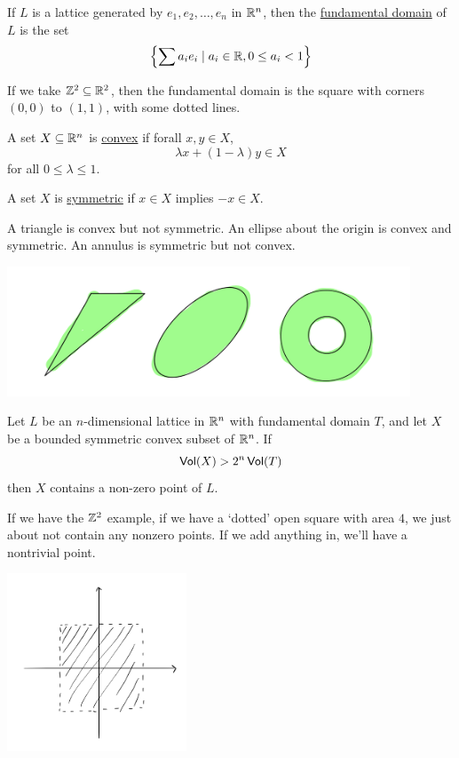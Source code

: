 \begin{definition}
    If $L$ is a lattice generated by $e_1, e_2, \dots, e_n$ in $\mathbb R^n$, then the \ul{fundamental domain} of $L$ is the set
    \[\left\{ \sum a_i e_i \mid a_i\in\mathbb R, 0\leq a_i < 1 \right\}\]
\end{definition}
\begin{example}
    If we take $\mathbb Z^2\subseteq\mathbb R^2$, then the fundamental domain is the square with corners $(0, 0)$ to $(1, 1)$, with some dotted lines.
\end{example}
\begin{definition}
    A set $X\subseteq\mathbb R^n$ is \ul{convex} if forall $x, y\in X$,
    \[\lambda x + (1 - \lambda)y \in X\]
    for all $0\leq \lambda \leq 1$.

    A set $X$ is \ul{symmetric} if $x\in X$ implies $-x\in X$.
\end{definition}
\begin{example}
    A triangle is convex but not symmetric. An ellipse about the origin is convex and symmetric. An annulus is symmetric but not convex.
    \begin{center}
        \includegraphics[width=0.9\textwidth]{images/shapes.png}
    \end{center}
\end{example}
\begin{theorem}
    Let $L$ be an $n$-dimensional lattice in $\mathbb R^n$ with fundamental domain $T$, and let $X$ be a bounded symmetric convex subset of $\mathbb R^n$. If
    \[\operatorname{\mathsf{Vol}}(X) > 2^n\operatorname{\mathsf{Vol}}(T)\]
    then $X$ contains a non-zero point of $L$.
\end{theorem}
\begin{example}
    If we have the $\mathbb Z^2$ example, if we have a `dotted' open square with area $4$, we just about not contain any nonzero points. If we add anything in, we'll have a nontrivial point.
    \begin{center}
        \includegraphics[width=0.4\textwidth]{images/square.png}
    \end{center}
\end{example}

